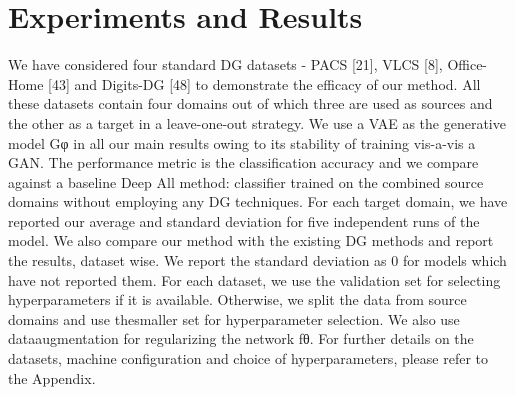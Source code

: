 \documentclass[review]{cvpr}
\begin{document}
\section{Experiments and Results}
We have considered four standard DG datasets - PACS
[21], VLCS [8], Office-Home [43] and Digits-DG [48] to
demonstrate the efficacy of our method. All these datasets
contain four domains out of which three are used as sources
and the other as a target in a leave-one-out strategy. We use
a VAE as the generative model Gφ in all our main results
owing to its stability of training vis-a-vis a GAN. The performance metric is the classification accuracy and we compare against a baseline Deep All method: classifier trained
on the combined source domains without employing any
DG techniques. For each target domain, we have reported
our average and standard deviation for five independent runs
of the model. We also compare our method with the existing DG methods and report the results, dataset wise. We
report the standard deviation as 0 for models which have
not reported them. For each dataset, we use the validation
set for selecting hyperparameters if it is available. Otherwise, we split the data from source domains and use thesmaller set for hyperparameter selection. We also use dataaugmentation for regularizing the network fθ. For further
details on the datasets, machine configuration and choice of
hyperparameters, please refer to the Appendix.
\end{document}
